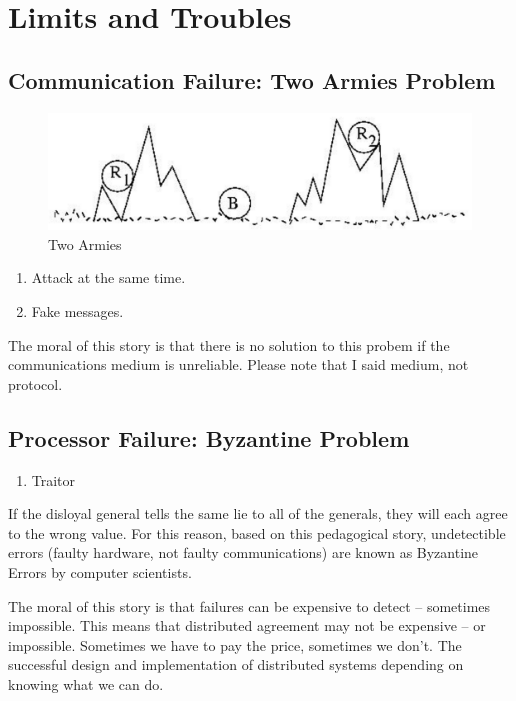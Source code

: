 \chapter{Limits and Troubles}


\section{Communication Failure: Two Armies Problem}
\begin{figure}
\centering
\includegraphics[width=\textwidth]{img/ch07-twoarmies.png}
\caption{Two Armies}
\label{fig:ch07-twoarmies}
\end{figure}

\begin{enumerate}
    \item Attack at the same time.
    \item Fake messages.
\end{enumerate}

The moral of this story is that there is no solution to this probem if the communications medium is unreliable. Please note that I said medium, not protocol.

\section{Processor Failure: Byzantine Problem}

\begin{enumerate}
    \item Traitor
\end{enumerate}

If the disloyal general tells the same lie to all of the generals, they will each agree to the wrong value. For this reason, based on this pedagogical story, undetectible errors (faulty hardware, not faulty communications) are known as Byzantine Errors by computer scientists.

The moral of this story is that failures can be expensive to detect -- sometimes impossible. This means that distributed agreement may not be expensive -- or impossible. Sometimes we have to pay the price, sometimes we don't. The successful design and implementation of distributed systems depending on knowing what we can do.

